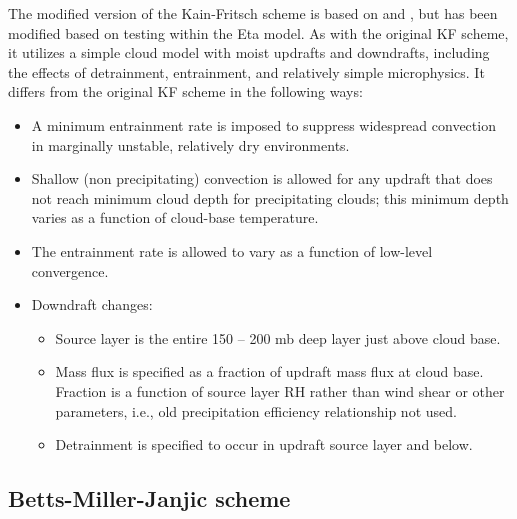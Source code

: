 The modified version of the Kain-Fritsch scheme \citep{kain04} is based on 
\citet{kain90} and \citet{kain93}, but has been modified based on 
testing within the Eta model. As with the original KF scheme, 
it utilizes a simple cloud model with moist updrafts and downdrafts, 
including the effects of detrainment, entrainment, and relatively 
simple microphysics. It differs from the original KF scheme in the following ways:

\begin{itemize}\setlength{\parskip}{-4pt}
\item
 A minimum entrainment rate is imposed to suppress widespread convection 
in marginally unstable, relatively dry environments.

\item
Shallow (non precipitating) convection is allowed for any updraft 
that does not reach minimum cloud depth for precipitating clouds; 
this minimum depth varies as a function of cloud-base temperature.

\item
The entrainment rate is allowed to vary as a function of low-level convergence.

\item
Downdraft changes:

\begin{itemize}\setlength{\parskip}{-4pt}
\item
Source layer is the entire 150 -- 200 mb deep layer just above cloud base.

\item
Mass flux is specified as a fraction of updraft mass flux at cloud base.
Fraction is a function of source layer RH rather than wind shear 
or other parameters, i.e., old precipitation efficiency relationship not used.

\item
Detrainment is specified to occur in updraft source layer and below.
\end{itemize}
\end{itemize}


\subsection{Betts-Miller-Janjic scheme}


